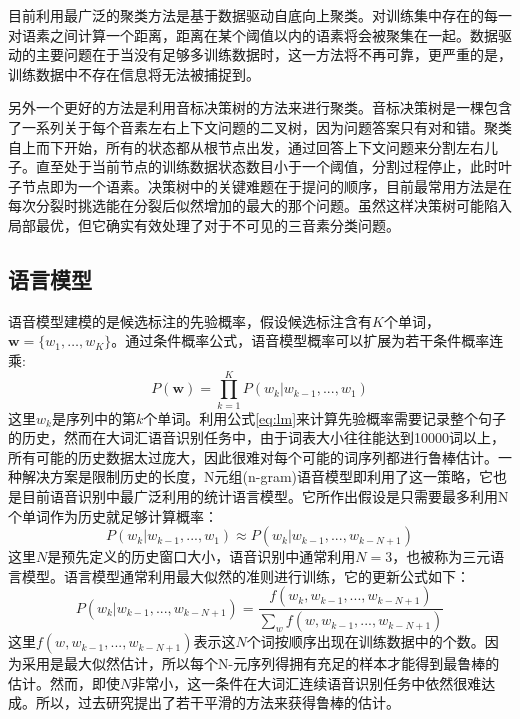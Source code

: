 目前利用最广泛的聚类方法是基于数据驱动自底向上聚类。对训练集中存在的每一对语素之间计算一个距离，距离在某个阈值以内的语素将会被聚集在一起。数据驱动的主要问题在于当没有足够多训练数据时，这一方法将不再可靠，更严重的是，训练数据中不存在信息将无法被捕捉到。

另外一个更好的方法是利用音标决策树的方法来进行聚类。音标决策树是一棵包含了一系列关于每个音素左右上下文问题的二叉树，因为问题答案只有对和错。聚类自上而下开始，所有的状态都从根节点出发，通过回答上下文问题来分割左右儿子。直至处于当前节点的训练数据状态数目小于一个阈值，分割过程停止，此时叶子节点即为一个语素。决策树中的关键难题在于提问的顺序，目前最常用方法是在每次分裂时挑选能在分裂后似然增加的最大的那个问题。虽然这样决策树可能陷入局部最优，但它确实有效处理了对于不可见的三音素分类问题。

\subsection{语言模型}
\label{sec:lm}
语音模型建模的是候选标注的先验概率，假设候选标注含有$K$个单词，$\mathbf{w}=\{w_1, \dots, w_K\}$。通过条件概率公式，语音模型概率可以扩展为若干条件概率连乘:
\begin{equation}
    \label{eq:lm}
    P(\mathbf{w})=\prod_{k=1}^{K}P(w_k|w_{k-1}, ..., w_1)
\end{equation}
这里$w_k$是序列中的第$k$个单词。利用公式\ref{eq:lm}来计算先验概率需要记录整个句子的历史，然而在大词汇语音识别任务中，由于词表大小往往能达到10000词以上，所有可能的历史数据太过庞大，因此很难对每个可能的词序列都进行鲁棒估计。一种解决方案是限制历史的长度，N元组(n-gram)语音模型即利用了这一策略，它也是目前语音识别中最广泛利用的统计语言模型。它所作出假设是只需要最多利用N个单词作为历史就足够计算概率：
\begin{equation}
    P(w_k|w_{k-1}, ..., w_1) \approx P(w_k|w_{k-1}, ..., w_{k-N+1})
\end{equation}
这里$N$是预先定义的历史窗口大小，语音识别中通常利用$N=3$，也被称为三元语言模型。语言模型通常利用最大似然的准则进行训练，它的更新公式如下：
\begin{equation}
    P(w_k|w_{k-1}, ..., w_{k-N+1})=\frac{f(w_k,w_{k-1},...,w_{k-N+1})}{\sum_wf(w,w_{k-1},...,w_{k-N+1})}
\end{equation}
这里$f(w,w_{k-1},...,w_{k-N+1})$表示这$N$个词按顺序出现在训练数据中的个数。因为采用是最大似然估计，所以每个N-元序列得拥有充足的样本才能得到最鲁棒的估计。然而，即使$N$非常小，这一条件在大词汇连续语音识别任务中依然很难达成。所以，过去研究提出了若干平滑的方法来获得鲁棒的估计。
